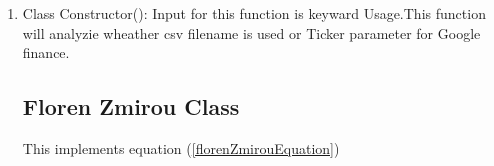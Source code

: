 \begin{enumerate}
  \item  Class Constructor(): Input for this function is keyward Usage.This function will analyzie wheather csv filename is used or Ticker parameter 
  for Google finance.
\subsection{Floren Zmirou Class}
This implements equation (\ref{florenZmirouEquation})

\end{enumerate}
